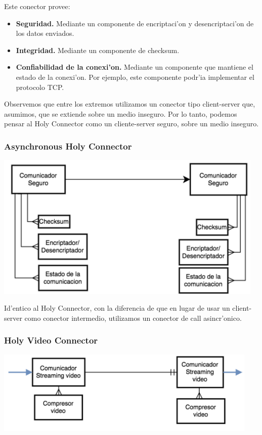 Este conector provee:

\begin{itemize}
	\item \textbf{Seguridad.} Mediante un componente de encriptaci'on y desencriptaci'on de los datos enviados.
	\item \textbf{Integridad.} Mediante un componente de checksum.
	\item \textbf{Confiabilidad de la conexi'on.} Mediante un componente que mantiene el estado de la conexi'on. Por ejemplo, este componente podr'ia implementar el protocolo TCP.
\end{itemize}

Observemos que entre los extremos utilizamos un conector tipo client-server que, asumimos, que se extiende sobre un medio inseguro. Por lo tanto, podemos pensar al Holy Connector como un cliente-server seguro, sobre un medio inseguro.

\subsubsection{Asynchronous Holy Connector}

\includegraphics[height=7cm]{diagramas/HCCA} 

Id'entico al Holy Connector, con la diferencia de que en lugar de usar un client-server como conector intermedio, utilizamos un conector de call asincr'onico.

\subsubsection{Holy Video Connector}

\includegraphics[height=4cm]{diagramas/HVC} 

